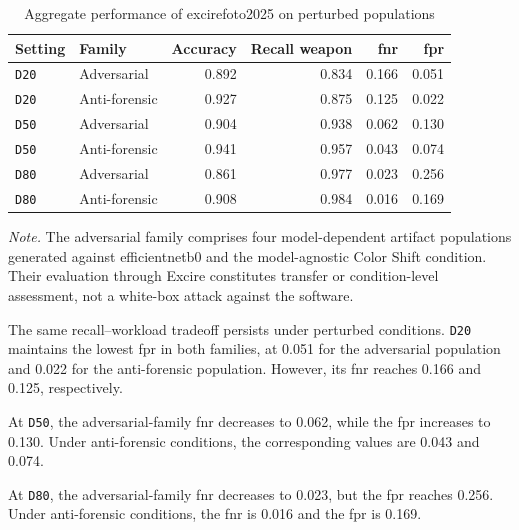 \begin{table}[H]
\centering
\caption{Aggregate performance of \gls{excirefoto2025} on perturbed
populations}
\label{tab:results-excire-perturbed-summary}
\small
\begin{tabular}{@{}l l r r r r@{}}
\toprule
\textbf{Setting} &
\textbf{Family} &
\textbf{Accuracy} &
\textbf{Recall weapon} &
\textbf{\gls{fnr}} &
\textbf{\gls{fpr}} \\
\midrule

\texttt{D20}
&
Adversarial
&
0.892
&
0.834
&
0.166
&
0.051 \\

\texttt{D20}
&
Anti-forensic
&
0.927
&
0.875
&
0.125
&
0.022 \\

\midrule

\texttt{D50}
&
Adversarial
&
0.904
&
0.938
&
0.062
&
0.130 \\

\texttt{D50}
&
Anti-forensic
&
0.941
&
0.957
&
0.043
&
0.074 \\

\midrule

\texttt{D80}
&
Adversarial
&
0.861
&
0.977
&
0.023
&
0.256 \\

\texttt{D80}
&
Anti-forensic
&
0.908
&
0.984
&
0.016
&
0.169 \\

\bottomrule
\end{tabular}

\vspace{0.4em}
\footnotesize
\textit{Note.} The adversarial family comprises four model-dependent artifact
populations generated against \gls{efficientnetb0} and the model-agnostic Color
Shift condition. Their evaluation through Excire constitutes transfer or
condition-level assessment, not a white-box attack against the software.
\end{table}

The same recall--workload tradeoff persists under perturbed conditions.
\texttt{D20} maintains the lowest \gls{fpr} in both families, at 0.051 for
the adversarial population and 0.022 for the anti-forensic population.
However, its \gls{fnr} reaches 0.166 and 0.125, respectively.

At \texttt{D50}, the adversarial-family \gls{fnr} decreases to 0.062, while
the \gls{fpr} increases to 0.130. Under anti-forensic conditions, the
corresponding values are 0.043 and 0.074.

At \texttt{D80}, the adversarial-family \gls{fnr} decreases to 0.023, but the
\gls{fpr} reaches 0.256. Under anti-forensic conditions, the \gls{fnr} is
0.016 and the \gls{fpr} is 0.169.

